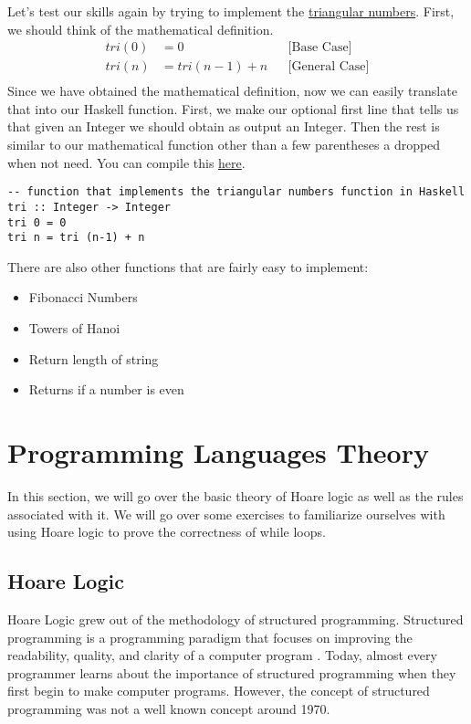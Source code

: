 \documentclass{article}
\begin{document}
Let's test our skills again by trying to implement the \href{https://en.wikipedia.org/wiki/Triangular_number}{triangular numbers}. First, we should think of the mathematical definition.
\begin{align*}
    tri(0) &= 0 &&\text{[Base Case]}\\
    tri(n) &= tri(n-1) + n &&\text{[General Case]}\\
\end{align*}
Since we have obtained the mathematical definition, now we can easily translate that into our Haskell function. First, we make our optional first line that tells us that given an Integer we should obtain as output an Integer. Then the rest is similar to our mathematical function other than a few parentheses a dropped when not need. You can compile this \href{https://replit.com/@ArielGutierrez/Triangle-numbers#main.hs}{here}.
\begin{lstlisting}
-- function that implements the triangular numbers function in Haskell
tri :: Integer -> Integer
tri 0 = 0
tri n = tri (n-1) + n
\end{lstlisting}

There are also other functions that are fairly easy to implement:
\begin{itemize}
  \item Fibonacci Numbers
  \item Towers of Hanoi
  \item Return length of string
  \item Returns if a number is even
\end{itemize}

\section{Programming Languages Theory}

In this section, we will go over the basic theory of Hoare logic as well as the rules associated with it. We will go over some exercises to familiarize ourselves with using Hoare logic to prove the correctness of while loops.

\subsection{Hoare Logic}

Hoare Logic grew out of the methodology of structured programming. Structured programming is a programming paradigm that focuses on improving the readability, quality, and clarity of a computer program \cite{6}. Today, almost every programmer learns about the importance of structured programming when they first begin to make computer programs. However, the concept of structured programming was not a well known concept around 1970.
\end{document}
